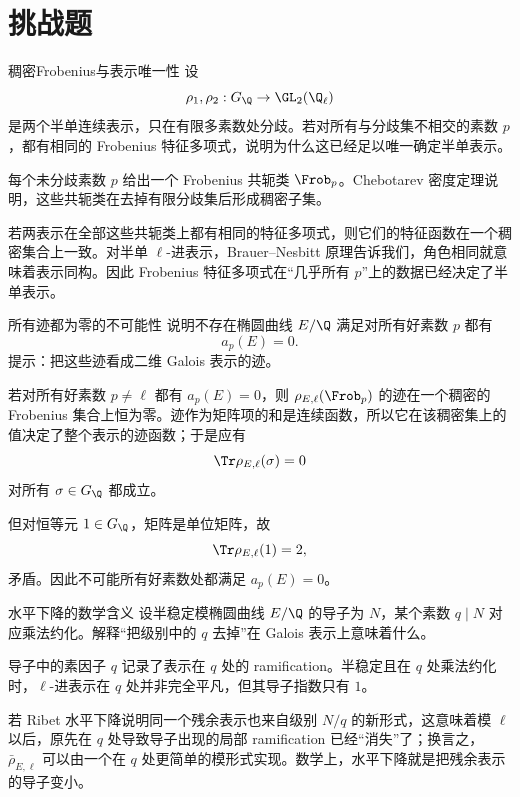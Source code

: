 \section{挑战题 \hard}

\begin{problem}{稠密Frobenius与表示唯一性}
\hard
设
\[
\rho_1,\rho_2:G_\Q\to\GL_2(\Q_\ell)
\]
是两个半单连续表示，只在有限多素数处分歧。若对所有与分歧集不相交的素数 $p$，都有相同的 Frobenius 特征多项式，说明为什么这已经足以唯一确定半单表示。
\end{problem}
\begin{solution}
每个未分歧素数 $p$ 给出一个 Frobenius 共轭类 $\Frob_p$。Chebotarev 密度定理说明，这些共轭类在去掉有限分歧集后形成稠密子集。

若两表示在全部这些共轭类上都有相同的特征多项式，则它们的特征函数在一个稠密集合上一致。对半单 $\ell$-进表示，Brauer--Nesbitt 原理告诉我们，角色相同就意味着表示同构。因此 Frobenius 特征多项式在“几乎所有 $p$”上的数据已经决定了半单表示。
\end{solution}

\begin{problem}{所有迹都为零的不可能性}
\hard
说明不存在椭圆曲线 $E/\Q$ 满足对所有好素数 $p$ 都有
\[
a_p(E)=0.
\]
提示：把这些迹看成二维 Galois 表示的迹。
\end{problem}
\begin{solution}
若对所有好素数 $p\neq\ell$ 都有 $a_p(E)=0$，则 $\rho_{E,\ell}(\Frob_p)$ 的迹在一个稠密的 Frobenius 集合上恒为零。迹作为矩阵项的和是连续函数，所以它在该稠密集上的值决定了整个表示的迹函数；于是应有
\[
\Tr\rho_{E,\ell}(\sigma)=0
\]
对所有 $\sigma\in G_\Q$ 都成立。

但对恒等元 $1\in G_\Q$，矩阵是单位矩阵，故
\[
\Tr\rho_{E,\ell}(1)=2,
\]
矛盾。因此不可能所有好素数处都满足 $a_p(E)=0$。
\end{solution}

\begin{problem}{水平下降的数学含义}
\hard
设半稳定模椭圆曲线 $E/\Q$ 的导子为 $N$，某个素数 $q\mid N$ 对应乘法约化。解释“把级别中的 $q$ 去掉”在 Galois 表示上意味着什么。
\end{problem}
\begin{solution}
导子中的素因子 $q$ 记录了表示在 $q$ 处的 ramification。半稳定且在 $q$ 处乘法约化时，$\ell$-进表示在 $q$ 处并非完全平凡，但其导子指数只有 $1$。

若 Ribet 水平下降说明同一个残余表示也来自级别 $N/q$ 的新形式，这意味着模 $\ell$ 以后，原先在 $q$ 处导致导子出现的局部 ramification 已经“消失”了；换言之，$\bar\rho_{E,\ell}$ 可以由一个在 $q$ 处更简单的模形式实现。数学上，水平下降就是把残余表示的导子变小。
\end{solution}

